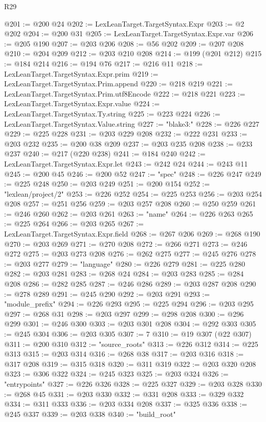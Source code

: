\begin{lexlean}{R29}
\begin{coremodule}
@201 := @200 @24
@202 := LexLeanTarget.TargetSyntax.Expr
@203 := @2 @202
@204 := @200 @31
@205 := LexLeanTarget.TargetSyntax.Expr.var
@206 := @205 @190
@207 := @203 @206
@208 := @56 @202
@209 := @207 @208
@210 := @204 @209
@212 := @203 @210 @208
@214 := @199 (@201 @212)
@215 := @184 @214
@216 := @194 @76
@217 := @216 @11
@218 := LexLeanTarget.TargetSyntax.Expr.prim
@219 := LexLeanTarget.TargetSyntax.Prim.append
@220 := @218 @219
@221 := LexLeanTarget.TargetSyntax.Prim.utf8Encode
@222 := @218 @221
@223 := LexLeanTarget.TargetSyntax.Expr.value
@224 := LexLeanTarget.TargetSyntax.Ty.string
@225 := @223 @224
@226 := LexLeanTarget.TargetSyntax.Value.string
@227 := "blake3:"
@228 := @226 @227
@229 := @225 @228
@231 := @203 @229 @208
@232 := @222 @231
@233 := @203 @232
@235 := @200 @38 @209
@237 := @203 @235 @208
@238 := @233 @237
@240 := @217 (@220 @238)
@241 := @184 @240
@242 := LexLeanTarget.TargetSyntax.Expr.let
@243 := @242 @24
@244 := @243 @11
@245 := @200 @45
@246 := @200 @52
@247 := "spec"
@248 := @226 @247
@249 := @225 @248
@250 := @203 @249
@251 := @200 @154
@252 := "lexlean/project/2"
@253 := @226 @252
@254 := @225 @253
@256 := @203 @254 @208
@257 := @251 @256
@259 := @203 @257 @208
@260 := @250 @259
@261 := @246 @260
@262 := @203 @261
@263 := "name"
@264 := @226 @263
@265 := @225 @264
@266 := @203 @265
@267 := LexLeanTarget.TargetSyntax.Expr.field
@268 := @267 @206
@269 := @268 @190
@270 := @203 @269
@271 := @270 @208
@272 := @266 @271
@273 := @246 @272
@275 := @203 @273 @208
@276 := @262 @275
@277 := @245 @276
@278 := @203 @277
@279 := "language"
@280 := @226 @279
@281 := @225 @280
@282 := @203 @281
@283 := @268 @24
@284 := @203 @283
@285 := @284 @208
@286 := @282 @285
@287 := @246 @286
@289 := @203 @287 @208
@290 := @278 @289
@291 := @245 @290
@292 := @203 @291
@293 := "module_prefix"
@294 := @226 @293
@295 := @225 @294
@296 := @203 @295
@297 := @268 @31
@298 := @203 @297
@299 := @298 @208
@300 := @296 @299
@301 := @246 @300
@303 := @203 @301 @208
@304 := @292 @303
@305 := @245 @304
@306 := @203 @305
@307 := 7
@310 := @19 @307 (@22 @307)
@311 := @200 @310
@312 := "source_roots"
@313 := @226 @312
@314 := @225 @313
@315 := @203 @314
@316 := @268 @38
@317 := @203 @316
@318 := @317 @208
@319 := @315 @318
@320 := @311 @319
@322 := @203 @320 @208
@323 := @306 @322
@324 := @245 @323
@325 := @203 @324
@326 := "entrypoints"
@327 := @226 @326
@328 := @225 @327
@329 := @203 @328
@330 := @268 @45
@331 := @203 @330
@332 := @331 @208
@333 := @329 @332
@334 := @311 @333
@336 := @203 @334 @208
@337 := @325 @336
@338 := @245 @337
@339 := @203 @338
@340 := "build_root"

\end{coremodule}
\end{lexlean}
